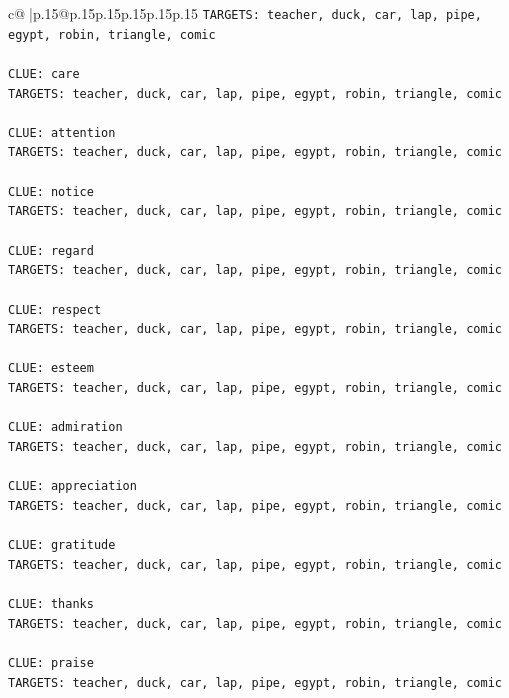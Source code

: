 \documentclass{article}
\begin{document}
{\begin{supertabular}{c@{$\;$}|p{.15\linewidth}@{}p{.15\linewidth}p{.15\linewidth}p{.15\linewidth}p{.15\linewidth}p{.15\linewidth}}
{{{\texttt{TARGETS: teacher, duck, car, lap, pipe, egypt, robin, triangle, comic} \\
\\ 
\texttt{CLUE: care} \\
\texttt{TARGETS: teacher, duck, car, lap, pipe, egypt, robin, triangle, comic} \\
\\ 
\texttt{CLUE: attention} \\
\texttt{TARGETS: teacher, duck, car, lap, pipe, egypt, robin, triangle, comic} \\
\\ 
\texttt{CLUE: notice} \\
\texttt{TARGETS: teacher, duck, car, lap, pipe, egypt, robin, triangle, comic} \\
\\ 
\texttt{CLUE: regard} \\
\texttt{TARGETS: teacher, duck, car, lap, pipe, egypt, robin, triangle, comic} \\
\\ 
\texttt{CLUE: respect} \\
\texttt{TARGETS: teacher, duck, car, lap, pipe, egypt, robin, triangle, comic} \\
\\ 
\texttt{CLUE: esteem} \\
\texttt{TARGETS: teacher, duck, car, lap, pipe, egypt, robin, triangle, comic} \\
\\ 
\texttt{CLUE: admiration} \\
\texttt{TARGETS: teacher, duck, car, lap, pipe, egypt, robin, triangle, comic} \\
\\ 
\texttt{CLUE: appreciation} \\
\texttt{TARGETS: teacher, duck, car, lap, pipe, egypt, robin, triangle, comic} \\
\\ 
\texttt{CLUE: gratitude} \\
\texttt{TARGETS: teacher, duck, car, lap, pipe, egypt, robin, triangle, comic} \\
\\ 
\texttt{CLUE: thanks} \\
\texttt{TARGETS: teacher, duck, car, lap, pipe, egypt, robin, triangle, comic} \\
\\ 
\texttt{CLUE: praise} \\
\texttt{TARGETS: teacher, duck, car, lap, pipe, egypt, robin, triangle, comic} \\
}}}
\end{supertabular}}
\end{document}
